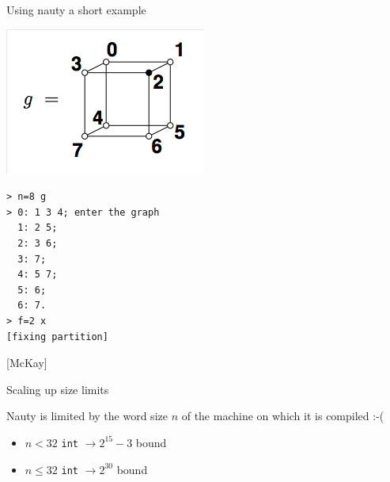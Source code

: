 \documentclass{beamer}
\begin{document}

\begin{frame}[fragile] {Using nauty}
{a short example}

\begin{center}
\includegraphics[scale=0.3]{dreadnautExample.png}
\end{center}

\bigskip

\begin{lstlisting}[frame=single]
> n=8 g
> 0: 1 3 4; enter the graph
  1: 2 5;
  2: 3 6;
  3: 7;
  4: 5 7;
  5: 6;
  6: 7. 
> f=2 x
[fixing partition]
\end{lstlisting}
[McKay]

\end{frame}


\begin{frame}[fragile] {Scaling up}
{size limits}

Nauty is limited by the word size $n$ of the machine on which it is compiled :-(

\bigskip

\begin{itemize}
\item 
$n < 32$ {\tt int} $\to 2^{15} - 3$ bound
\item 
$n \leq 32$ {\tt int} $\to 2^{30}$ bound
\end{itemize}


\end{frame}

\end{document}

